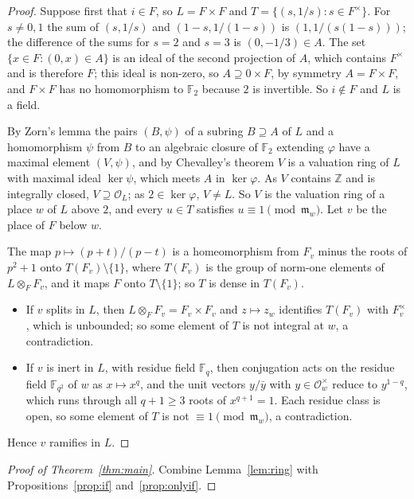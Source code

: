 \documentclass[11pt,a4paper]{amsart}
\theoremstyle{definition}
\newcommand{\F}{\mathbb{F}}
\newcommand{\Z}{\mathbb{Z}}
\newcommand{\Oo}{\mathcal{O}}
\newcommand{\m}{\mathfrak{m}}
\begin{document}
\begin{proof}
Suppose first that $i\in F$, so $L=F\times F$ and $T=\{(s,1/s):s\in F^\times\}$. For $s\neq0,1$ the sum of
$(s,1/s)$ and $(1-s,1/(1-s))$ is $(1,1/(s(1-s)))$; the difference of the sums for $s=2$ and $s=3$ is
$(0,-1/3)\in A$. The set $\{x\in F:(0,x)\in A\}$ is an ideal of the second projection of $A$, which contains
$F^\times$ and is therefore $F$; this ideal is non-zero, so $A\supseteq 0\times F$, by symmetry $A=F\times F$,
and $F\times F$ has no homomorphism to $\F_2$ because $2$ is invertible. So $i\notin F$ and $L$ is a field.

By Zorn's lemma the pairs $(B,\psi)$ of a subring $B\supseteq A$ of $L$ and a homomorphism $\psi$ from $B$ to an
algebraic closure of $\F_2$ extending $\varphi$ have a maximal element $(V,\psi)$, and by Chevalley's theorem
\cite[Lemma~5.19 and Theorem~5.21]{AM} $V$ is a valuation ring of $L$ with maximal ideal $\ker\psi$, which meets
$A$ in $\ker\varphi$. As $V$ contains $\Z$ and is integrally closed, $V\supseteq\Oo_L$; as $2\in\ker\varphi$,
$V\neq L$. So $V$ is the valuation ring of a place $w$ of $L$ above $2$, and every $u\in T$ satisfies
$u\equiv1\pmod{\m_w}$. Let $v$ be the place of $F$ below $w$.

The map $p\mapsto(p+t)/(p-t)$ is a homeomorphism from $F_v$ minus the roots of $p^2+1$ onto $T(F_v)\setminus\{1\}$,
where $T(F_v)$ is the group of norm-one elements of $L\otimes_F F_v$, and it maps $F$ onto $T\setminus\{1\}$; so
$T$ is dense in $T(F_v)$.
\begin{itemize}
\item If $v$ splits in $L$, then $L\otimes_F F_v=F_v\times F_v$ and $z\mapsto z_w$ identifies $T(F_v)$ with
$F_v^\times$, which is unbounded; so some element of $T$ is not integral at $w$, a contradiction.
\item If $v$ is inert in $L$, with residue field $\F_q$, then conjugation acts on the residue field $\F_{q^2}$ of
$w$ as $x\mapsto x^q$, and the unit vectors $y/\bar y$ with $y\in\Oo_w^\times$ reduce to $y^{1-q}$, which runs
through all $q+1\ge3$ roots of $x^{q+1}=1$. Each residue class is open, so some element of $T$ is not
$\equiv1\pmod{\m_w}$, a contradiction.
\end{itemize}
Hence $v$ ramifies in $L$.
\end{proof}

\begin{proof}[Proof of Theorem~\ref{thm:main}]
Combine Lemma~\ref{lem:ring} with Propositions~\ref{prop:if} and~\ref{prop:onlyif}.
\end{proof}
\end{document}
